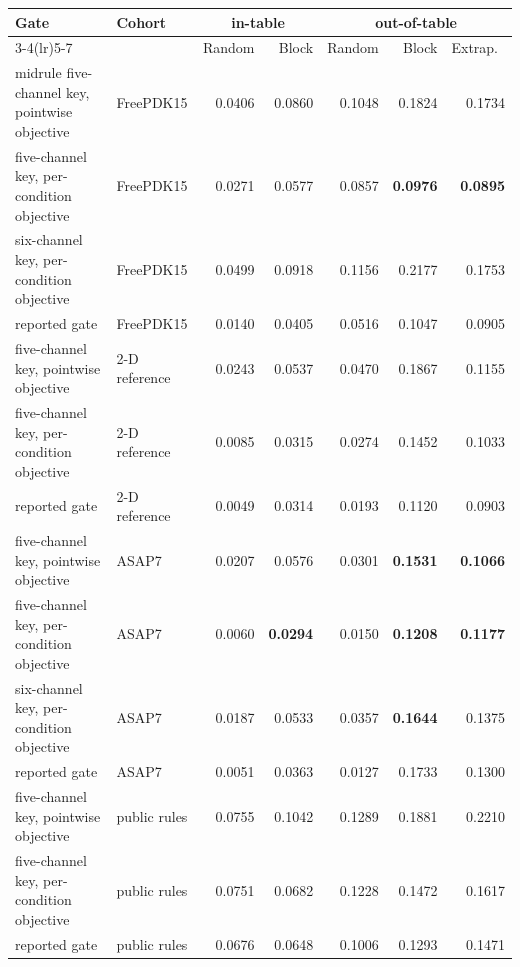 \small
\begin{tabular}{llrrrrr}\toprule
Gate & Cohort & \multicolumn{2}{c}{in-table} & \multicolumn{3}{c}{out-of-table} \\
\cmidrule(lr){3-4}\cmidrule(lr){5-7}
 & & Random & Block & Random & Block & Extrap.\ \\midrule
five-channel key, pointwise objective & FreePDK15 & 0.0406 & 0.0860 & 0.1048 & 0.1824 & 0.1734 \\
five-channel key, per-condition objective & FreePDK15 & 0.0271 & 0.0577 & 0.0857 & \textbf{0.0976} & \textbf{0.0895} \\
six-channel key, per-condition objective & FreePDK15 & 0.0499 & 0.0918 & 0.1156 & 0.2177 & 0.1753 \\
reported gate & FreePDK15 & 0.0140 & 0.0405 & 0.0516 & 0.1047 & 0.0905 \\
\addlinespace
five-channel key, pointwise objective & 2-D reference & 0.0243 & 0.0537 & 0.0470 & 0.1867 & 0.1155 \\
five-channel key, per-condition objective & 2-D reference & 0.0085 & 0.0315 & 0.0274 & 0.1452 & 0.1033 \\
reported gate & 2-D reference & 0.0049 & 0.0314 & 0.0193 & 0.1120 & 0.0903 \\
\addlinespace
five-channel key, pointwise objective & ASAP7 & 0.0207 & 0.0576 & 0.0301 & \textbf{0.1531} & \textbf{0.1066} \\
five-channel key, per-condition objective & ASAP7 & 0.0060 & \textbf{0.0294} & 0.0150 & \textbf{0.1208} & \textbf{0.1177} \\
six-channel key, per-condition objective & ASAP7 & 0.0187 & 0.0533 & 0.0357 & \textbf{0.1644} & 0.1375 \\
reported gate & ASAP7 & 0.0051 & 0.0363 & 0.0127 & 0.1733 & 0.1300 \\
\addlinespace
five-channel key, pointwise objective & public rules & 0.0755 & 0.1042 & 0.1289 & 0.1881 & 0.2210 \\
five-channel key, per-condition objective & public rules & 0.0751 & 0.0682 & 0.1228 & 0.1472 & 0.1617 \\
reported gate & public rules & 0.0676 & 0.0648 & 0.1006 & 0.1293 & 0.1471 \\
\bottomrule\end{tabular}
